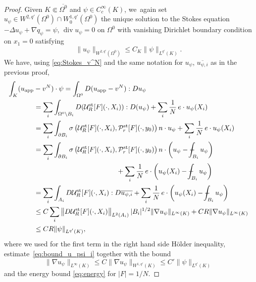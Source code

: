 \documentclass[JEP,XML,SOM,Unicode,NoEqCountersInSection,published]{cedram}
\newcommand{\app}{\mathrm{app}}
\newcommand{\st}{\mathrm{st}}
\def\Xint#1{\mathchoice
{\XXint\displaystyle\textstyle{#1}}%
{\XXint\textstyle\scriptstyle{#1}}%
{\XXint\scriptstyle\scriptscriptstyle{#1}}%
{\XXint\scriptscriptstyle\scriptscriptstyle{#1}}%
\!\int}
\def\XXint#1#2#3{{\setbox0=\hbox{$#1{#2#3}{\int}$ }
\vcenter{\hbox{$#2#3$ }}\kern-.6\wd0}}
\def\dashint{\Xint-}
\renewcommand{\div}{\operatorname{div}}
\theoremstyle{plain}
\theoremstyle{definition}
\begin{document}
\begin{proof}
Given $K \Subset \overline{\Omega^0}$ and $\psi \in C^\infty_c(K)$, we~again set $u_\psi \in W^{2,q'}(\Omega^0) \cap W^{1,q'}_0(\Omega^0)$ the unique solution to the Stokes equation $-\Delta u_\psi+\nabla q_\psi=\psi $, $\div u_\psi=0$ on $\Omega^0$ with vanishing Dirichlet boundary condition on $x_1=0$ satisfying
\begin{equation}\label{eq:estimation_dualite}
\|u_\psi \|_{W^{2,q'}(\Omega^0)} \leq C_K \|\psi\|_{L^{q'}(K)}.
\end{equation}
We have, using \eqref{eq:Stokes_v^N} and the same notation for $u_\psi$, $\overline{u_{\psi,i}}$ as in the previous proof,\vspace*{-3pt}
\begin{align*}
\int_K(u_{\app}&-v^N)\cdot \psi =\int_{\Omega^0} D(u_{\app}-v^N): Du_{\psi}\\
&=\sum_i \int_{\Omega^0\setminus B_i } D(\mathcal{U}^{\st}_R[F](\cdot,X_i)) : D(u_{\psi}) + \sum_i\frac{1}{N}\,e \cdot u_\psi(X_i)\\
&= \sum_i \int_{\partial B_i}\sigma \left(\mathcal{U}^{\st}_R[F](\cdot,X_i),\mathcal{P}^{\st}_{r}[F](\cdot,y_0)\right) n \cdot u_{\psi} +\sum_i \frac{1}{N}\,e \cdot u_\psi(X_i)\\
&= \sum_i \int_{\partial B_i}\sigma \left(\mathcal{U}^{\st}_R[F](\cdot,X_i), \mathcal{P}^{\st}_{r}[F](\cdot,y_0)\right) n \cdot \left(u_{\psi}- \dashint_{B_i} u_\psi\right) \\
&\hspace*{4.2cm}+ \sum_i\frac{1}{N}\, e \cdot \left(u_\psi(X_i)-\dashint_{B_i} u_\psi \right)\\
&=\sum_i \int_{A_i} D \mathcal{U}^{\st}_R[F](\cdot,X_i): D\overline{u_{\psi,i}} + \sum_i\frac{1}{N}\, e \cdot \left(u_\psi(X_i)-\dashint_{B_i} u_\psi \right)\\
& \leq C \sum_i \left \| D \mathcal{U}^{\st}_R[F](\cdot,X_i) \right\|_{L^2(A_i)} |B_i|^{1/2} \|\nabla u_\psi\|_{L^\infty(K)}+ CR \|\nabla u_\psi\|_{L^\infty(K)}\\
& \leq CR \|\psi\|_{L^{q'}(K)},
\end{align*}
where we used for the first term in the right hand side Hölder inequality, estimate~\eqref{eq:bound_u_psi_i} together with the bound\vspace*{-3pt}
\[
\|\nabla u_\psi\|_{L^\infty(K)} \le C \|\nabla u_\psi\|_{W^{1,q'}(K)} \le C' \|\psi\|_{L^{q'}(K)}
\]
and the energy bound \eqref{eq:energy} for $|F|=1/N$.
\end{proof}
\end{document}
